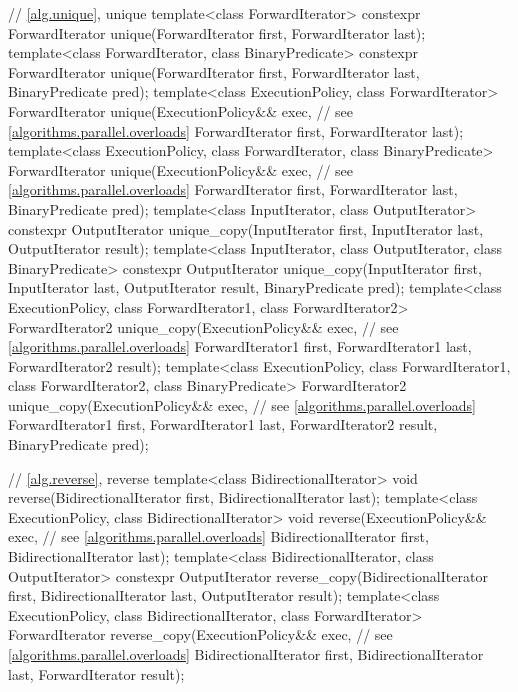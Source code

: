 \begin{codeblock}
{  // \ref{alg.unique}, unique
  template<class ForwardIterator>
    constexpr ForwardIterator unique(ForwardIterator first, ForwardIterator last);
  template<class ForwardIterator, class BinaryPredicate>
    constexpr ForwardIterator unique(ForwardIterator first, ForwardIterator last,
                                     BinaryPredicate pred);
  template<class ExecutionPolicy, class ForwardIterator>
    ForwardIterator unique(ExecutionPolicy&& exec, // see \ref{algorithms.parallel.overloads}
                           ForwardIterator first, ForwardIterator last);
  template<class ExecutionPolicy, class ForwardIterator, class BinaryPredicate>
    ForwardIterator unique(ExecutionPolicy&& exec, // see \ref{algorithms.parallel.overloads}
                           ForwardIterator first, ForwardIterator last,
                           BinaryPredicate pred);
  template<class InputIterator, class OutputIterator>
    constexpr OutputIterator
      unique_copy(InputIterator first, InputIterator last,
                  OutputIterator result);
  template<class InputIterator, class OutputIterator, class BinaryPredicate>
    constexpr OutputIterator
      unique_copy(InputIterator first, InputIterator last,
                  OutputIterator result, BinaryPredicate pred);
  template<class ExecutionPolicy, class ForwardIterator1, class ForwardIterator2>
    ForwardIterator2
      unique_copy(ExecutionPolicy&& exec, // see \ref{algorithms.parallel.overloads}
                  ForwardIterator1 first, ForwardIterator1 last,
                  ForwardIterator2 result);
  template<class ExecutionPolicy, class ForwardIterator1, class ForwardIterator2,
           class BinaryPredicate>
    ForwardIterator2
      unique_copy(ExecutionPolicy&& exec, // see \ref{algorithms.parallel.overloads}
                  ForwardIterator1 first, ForwardIterator1 last,
                  ForwardIterator2 result, BinaryPredicate pred);

  // \ref{alg.reverse}, reverse
  template<class BidirectionalIterator>
    void reverse(BidirectionalIterator first, BidirectionalIterator last);
  template<class ExecutionPolicy, class BidirectionalIterator>
    void reverse(ExecutionPolicy&& exec, // see \ref{algorithms.parallel.overloads}
                 BidirectionalIterator first, BidirectionalIterator last);
  template<class BidirectionalIterator, class OutputIterator>
    constexpr OutputIterator
      reverse_copy(BidirectionalIterator first, BidirectionalIterator last,
                   OutputIterator result);
  template<class ExecutionPolicy, class BidirectionalIterator, class ForwardIterator>
    ForwardIterator
      reverse_copy(ExecutionPolicy&& exec, // see \ref{algorithms.parallel.overloads}
                   BidirectionalIterator first, BidirectionalIterator last,
                   ForwardIterator result);

}
\end{codeblock}
